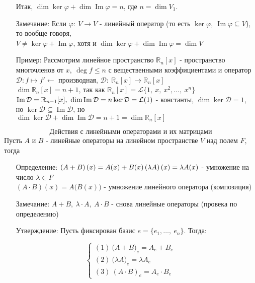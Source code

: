 \documentclass[12pt, letterpaper, twoside]{article}
\newcommand{\mb}[1]{\mathbb{#1}}
\begin{document}
\begin{enumerate}
            Итак, $\dim \ker \varphi + \dim \operatorname{Im} \varphi = n$, где $n = \dim V_1$.
            \item[Замечание:] Если $\varphi:\ V\longrightarrow V$ - линейный оператор (то есть $\ker \varphi,\ \operatorname{Im}\varphi \subseteq V$), то вообще говоря,\\
            $V \neq \ker \varphi + \operatorname{Im}\varphi$, хотя и $\dim \ker \varphi + \dim \operatorname{Im}\varphi = \dim V$
            \item[Пример:] Рассмотрим линейное пространство $\mb{R}_n[x]$ - пространство многочленов от $x,\ \deg f \leq n$ с вещественными коэффициентами и оператор $\mathcal{D}: f\mapsto f'\leftarrow$ производная, $\mathcal{D}:\ \mb{R}_n[x]\rightarrow \mb{R}_n[x]$\\
            $\dim \mb{R}_n[x] = n + 1$, так как $\mb{R}_n[x] = \mathcal{L}\{1,\ x,\ x^2,\dots,\ x^n\}$\\
            $\operatorname{Im} \mathcal{D} = \mb{R}_{n - 1}[x],\ \dim \operatorname{Im}\mathcal{D} = n\\
            \ker \mathcal{D} = \mathcal{L}(1)$ - константы, $\dim\ker \mathcal{D} = 1$,\\
            но $\ker \mathcal{D} \subseteq \operatorname{Im}\mathcal{D}$, но\\
            $\dim \ker \mathcal{D} + \dim \operatorname{Im}\mathcal{D} = n + 1 = \dim \mb{R}_n[x]$
        \end{enumerate}
        \[\text{Действия с линейными операторами и их матрицами}\]
        Пусть $A$ и $B$ - линейные операторы на линейном пространстве $V$ над полем $F$, тогда
        \begin{enumerate}
            \item[Определение:] $\left( A + B \right)(x) = A(x) + B(x)\\
            \left(\lambda A\right)(x) = \lambda A(x)$ - умножение на число $\lambda \in F$\\
            $\left(A\cdot B\right)(x) = A\big(B(x)\big)$ - умножение линейного оператора (композиция)
            \item[Замечание:] $A + B,\ \lambda\cdot A,\ A\cdot B$ - снова линейные операторы (провека по определению)
            \item[Утверждение:] Пусть фиксирован базис $e = \{e_1,\dots,\ e_n\}$. Тогда:
        \end{enumerate}
            \[\begin{cases}
                (1)\ \big(A + B\big)_e = A_e + B_e\\
                (2)\ \big(\lambda A\big)_e = \lambda A_e\\
                (3)\ \left( A\cdot B\right)_e = A_e\cdot B_e
            \end{cases}\]
\end{document}
